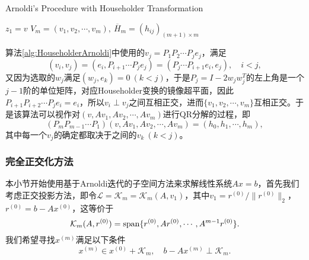 \documentclass[a4paper,10pt]{ctexart}
\begin{document}
\begin{algorithm}[htbp]
    \caption{Arnoldi's Procedure with Householder Transformation}\label{alg:HouseholderArnoldi}
    $ z_1 = v $\;
    \Return $ V_m = (v_1, v_2, \cdots , v_m),\ \overline{H}_m = (h_{ij})_{(m+1)\times m} $\;
\end{algorithm}

算法\ref{alg:HouseholderArnoldi}中使用的$ v_j = P_1P_2\cdots P_je_j $，满足
\[
    (v_i,v_j) = (e_i, P_{i+1}\cdots P_je_j) = (P_{j}\cdots P_{i+1} e_i, e_j),\quad i<j,
\]
又因为选取的$ w_j $满足$ (w_j,e_k) = 0\ (k<j) $，于是$ P_j=I-2w_jw^T_j $的左上角是一个$ j-1 $阶的单位矩阵，对应Householder变换的镜像超平面，因此$ P_{i+1}P_{i+2}\cdots P_{j}e_i = e_i $，所以$ v_i\perp v_j $之间互相正交，进而$ \{v_1,v_2,\cdots ,v_m\} $互相正交。于是该算法可以视作对$ (v,Av_1,Av_2,\cdots ,Av_m) $进行QR分解的过程，即
\[
    (P_mP_{m-1}\cdots P_1)(v,Av_1,Av_2,\cdots ,Av_m) = (h_0,h_1,\cdots ,h_m),
\]
其中每一个$ v_j $的确定都取决于之间的$ v_k\ (k<j) $。

\subsubsection{完全正交化方法}

本小节开始使用基于Arnoldi迭代的子空间方法来求解线性系统$ Ax=b $，首先我们考虑正交投影方法，即令$ \mathcal{L}=\mathcal{K}_m = \mathcal{K}_m(A,v_1) $，其中$ v_1 = r^{(0)} / \| r^{(0)} \|_2 $，$ r^{(0)} = b - Ax^{(0)} $，这等价于
\[
    \mathcal{K}_m(A,r^{(0)}) = {\rm span}\{r^{(0)},Ar^{(0)},\cdots ,A^{m-1}r^{(0)}\}.
\]
我们希望寻找$ x^{(m)} $满足以下条件
\begin{equation}\label{eq:FOM}
    x^{(m)}\in x^{(0)}+\mathcal{K}_m,\quad b - Ax^{(m)}\perp \mathcal{K}_m.
\end{equation}
\end{document}
